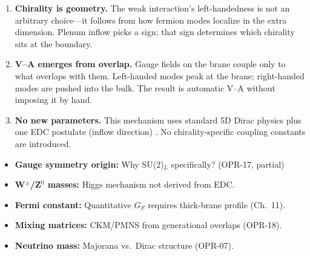 \begin{tcolorbox}[colback=blue!5!white, colframe=blue!50!black,
    title=\textbf{Three Takeaways}]
\begin{enumerate}
    \item \textbf{Chirality is geometry.}
          The weak interaction's left-handedness is not an arbitrary choice---it follows
          from how fermion modes localize in the extra dimension. Plenum inflow picks
          a sign; that sign determines which chirality sits at the boundary.

    \item \textbf{V–A emerges from overlap.}
          Gauge fields on the brane couple only to what overlaps with them. Left-handed
          modes peak at the brane; right-handed modes are pushed into the bulk. The
          result is automatic V–A without imposing it by hand.

    \item \textbf{No new parameters.}
          This mechanism uses standard 5D Dirac physics \tagBL{} plus one EDC postulate
          (inflow direction) \tagP{}. No chirality-specific coupling constants are introduced.
\end{enumerate}
\end{tcolorbox}

\medskip


\begin{tcolorbox}[colback=red!5!white, colframe=red!50!black,
    title=\textbf{What Remains Open}]
\begin{itemize}[nosep]
    \item \textbf{Gauge symmetry origin:} Why SU(2)$_L$ specifically? (OPR-17, partial)
    \item \textbf{W$^\pm$/Z$^0$ masses:} Higgs mechanism not derived from EDC.
    \item \textbf{Fermi constant:} Quantitative $G_F$ requires thick-brane profile (Ch.~11).
    \item \textbf{Mixing matrices:} CKM/PMNS from generational overlaps (OPR-18).
    \item \textbf{Neutrino mass:} Majorana vs.\ Dirac structure (OPR-07).
\end{itemize}
\end{tcolorbox}

\medskip



